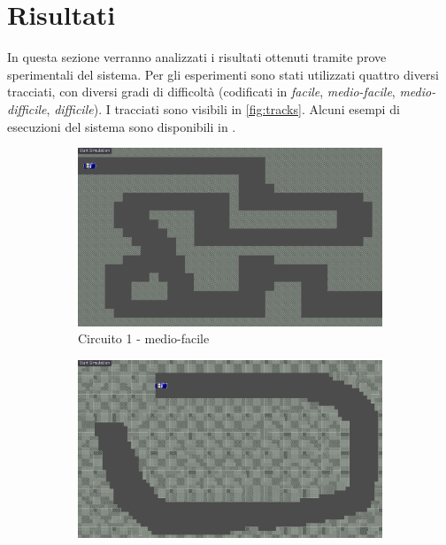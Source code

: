 \documentclass[a4paper,12pt]{article}
\begin{document}
\section{Risultati} \label{risultati}
In questa sezione verranno analizzati i risultati ottenuti tramite prove sperimentali del sistema. Per gli esperimenti sono stati utilizzati quattro diversi tracciati, con diversi gradi di difficoltà (codificati in \emph{facile}, \emph{medio-facile}, \emph{medio-difficile}, \emph{difficile}). I tracciati sono visibili in \autoref{fig:tracks}. Alcuni esempi di esecuzioni del sistema sono disponibili in \cite{ourRepo}.
\begin{figure}[H]
	\centering
	\begin{subfigure}[b]{0.475\textwidth}
		\centering
		\includegraphics[width=\textwidth]{./img/track01.png}
		\caption[Network2]%
		{{\small Circuito 1 - medio-facile}}    
	\end{subfigure}
	\hfill
	\begin{subfigure}[b]{0.475\textwidth}  
		\centering 
		\includegraphics[width=\textwidth]{./img/track02.png}

\end{subfigure}
\end{figure}
\end{document}
